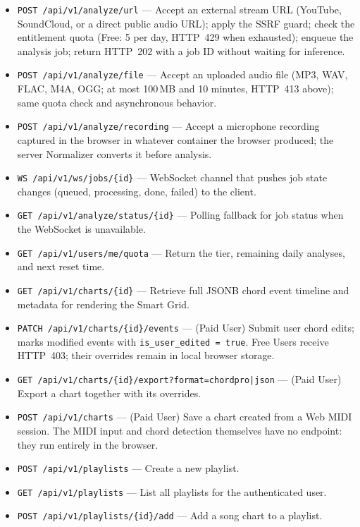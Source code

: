 \documentclass[a4paper]{article}
\begin{document}
\begin{itemize}
    \item \texttt{POST /api/v1/analyze/url} --- Accept an external stream URL (YouTube, SoundCloud, or a direct public audio URL); apply the SSRF guard; check the entitlement quota (Free: 5 per day, HTTP~429 when exhausted); enqueue the analysis job; return HTTP~202 with a job ID without waiting for inference.
    \item \texttt{POST /api/v1/analyze/file} --- Accept an uploaded audio file (MP3, WAV, FLAC, M4A, OGG; at most 100\,MB and 10 minutes, HTTP~413 above); same quota check and asynchronous behavior.
    \item \texttt{POST /api/v1/analyze/recording} --- Accept a microphone recording captured in the browser in whatever container the browser produced; the server Normalizer converts it before analysis.
    \item \texttt{WS /api/v1/ws/jobs/\{id\}} --- WebSocket channel that pushes job state changes (queued, processing, done, failed) to the client.
    \item \texttt{GET /api/v1/analyze/status/\{id\}} --- Polling fallback for job status when the WebSocket is unavailable.
    \item \texttt{GET /api/v1/users/me/quota} --- Return the tier, remaining daily analyses, and next reset time.
    \item \texttt{GET /api/v1/charts/\{id\}} --- Retrieve full JSONB chord event timeline and metadata for rendering the Smart Grid.
    \item \texttt{PATCH /api/v1/charts/\{id\}/events} --- (Paid User) Submit user chord edits; marks modified events with \texttt{is\_user\_edited = true}. Free Users receive HTTP~403; their overrides remain in local browser storage.
    \item \texttt{GET /api/v1/charts/\{id\}/export?format=chordpro|json} --- (Paid User) Export a chart together with its overrides.
    \item \texttt{POST /api/v1/charts} --- (Paid User) Save a chart created from a Web MIDI session. The MIDI input and chord detection themselves have no endpoint: they run entirely in the browser.
    \item \texttt{POST /api/v1/playlists} --- Create a new playlist.
    \item \texttt{GET /api/v1/playlists} --- List all playlists for the authenticated user.
    \item \texttt{POST /api/v1/playlists/\{id\}/add} --- Add a song chart to a playlist.

\end{itemize}
\end{document}
